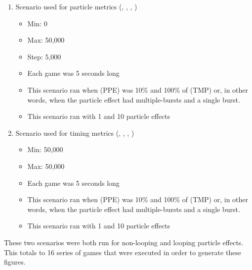 \begin{enumerate}[nolistsep,topsep=2pt]

	\item Scenario used for particle metrics (, , , )
	\begin{itemize}[nolistsep,topsep=0pt]
		\item Min: 0
		\item Max: 50,000
		\item Step: 5,000
		\item Each game was 5 seconds long
		\item This scenario ran when  (PPE) was 10\% and 100\% of  (TMP) or, in other words, when the particle effect had multiple-bursts and a single burst.
		\item This scenario ran with 1 and 10 particle effects
	\end{itemize}

	\item Scenario used for timing metrics (, , , )
	\begin{itemize}[nolistsep,topsep=0pt]
		\item Min: 50,000
		\item Max: 50,000
		\item Each game was 5 seconds long
		\item This scenario ran when  (PPE) was 10\% and 100\% of  (TMP) or, in other words, when the particle effect had multiple-bursts and a single burst.
		\item This scenario ran with 1 and 10 particle effects
	\end{itemize}

\end{enumerate}

These two scenarios were both run for non-looping and looping particle effects\footnotemark. This totals to 16 series of games that were executed in order to generate these figures.


